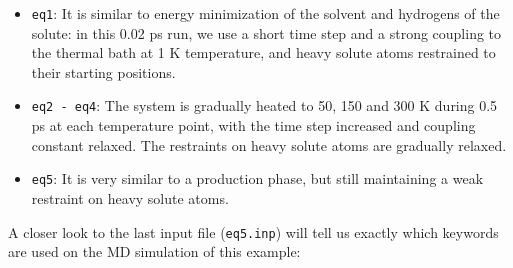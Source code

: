 \documentclass[a4paper,12pt]{article}
\begin{document}
\begin {itemize}

\item  \texttt{eq1}:  It is  similar  to  energy minimization  of  the
solvent and  hydrogens of the  solute: in this 0.02  ps run, we  use a
short time  step and  a strong  coupling to  the thermal  bath at  1 K
temperature,  and  heavy solute  atoms  restrained  to their  starting
positions.

\item \texttt{eq2  - eq4}: The system  is gradually heated to  50, 150
and 300 K during 0.5 ps at  each temperature point, with the time step
increased  and  coupling constant  relaxed.  The  restraints on  heavy
solute atoms are gradually relaxed.

\item  \texttt{eq5}: It  is very  similar to  a production  phase, but
still maintaining a weak restraint on heavy solute atoms.

\end {itemize}

A closer look  to the last input file (\texttt{eq5.inp})  will tell us
exactly which keywords are used on the MD simulation of this example:
\end{document}
